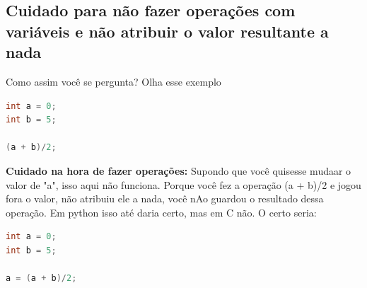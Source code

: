 \documentclass{article}
\begin{document}
\subsection{Cuidado para não fazer operações com variáveis e não atribuir o valor resultante a nada} Como assim você se pergunta? Olha esse exemplo
\begin{lstlisting}[language=C]
int a = 0;
int b = 5;

(a + b)/2;
\end{lstlisting}
\textbf{Cuidado na hora de fazer operações:} Supondo que você quisesse mudaar o valor de "a", isso aqui não funciona. Porque você fez a operação (a + b)/2 e jogou fora o valor, não atribuiu ele a nada, você nAo guardou o resultado dessa operação. Em python isso até daria certo, mas em C não. O certo seria:
\begin{lstlisting}[language=C]
int a = 0;
int b = 5;

a = (a + b)/2;
\end{lstlisting}
\end{document}
